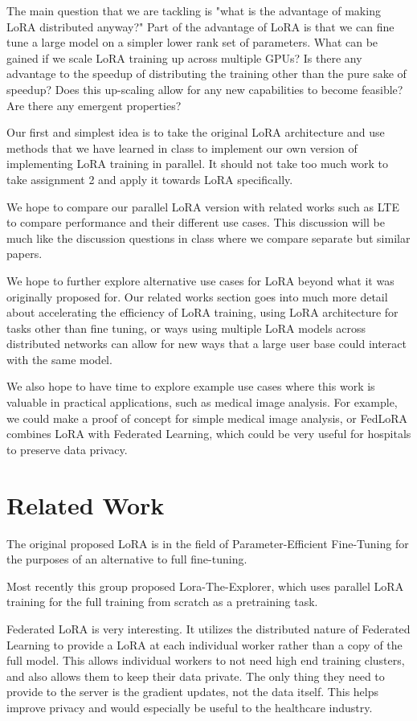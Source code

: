 \documentclass[pdftex,twocolumn,10pt,letterpaper]{article}
\begin{document}
The main question that we are tackling is "what is the advantage of making LoRA distributed anyway?" Part of the advantage of LoRA is that we can fine tune a large model on a simpler lower rank set of parameters. What can be gained if we scale LoRA training up across multiple GPUs? Is there any advantage to the speedup of distributing the training other than the pure sake of speedup? Does this up-scaling allow for any new capabilities to become feasible? Are there any emergent properties?

Our first and simplest idea is to take the original LoRA architecture and use methods that we have learned in class to implement our own version of implementing LoRA training in parallel. It should not take too much work to take assignment 2 and apply it towards LoRA specifically.

We hope to compare our parallel LoRA version with related works such as LTE to compare performance and their different use cases. This discussion will be much like the discussion questions in class where we compare separate but similar papers.

We hope to further explore alternative use cases for LoRA beyond what it was originally proposed for. Our related works section goes into much more detail about accelerating the efficiency of LoRA training, using LoRA architecture for tasks other than fine tuning, or ways using multiple LoRA models across distributed networks can allow for new ways that a large user base could interact with the same model.

We also hope to have time to explore example use cases where this work is valuable in practical applications, such as medical image analysis. For example, we could make a proof of concept for simple medical image analysis, or FedLoRA combines LoRA with Federated Learning, which could be very useful for hospitals to preserve data privacy.
 
\section{Related Work}
\cite{Hu2021LoRA}
The original proposed LoRA is in the field of Parameter-Efficient Fine-Tuning for the purposes of an alternative to full fine-tuning.

\cite{huh2024training}
Most recently this group proposed Lora-The-Explorer, which uses parallel LoRA training for the full training from scratch as a pretraining task. 

\cite{yi2023fedlora}
\cite{Rieke2019FederatedLearning}
Federated LoRA is very interesting. It utilizes the distributed nature of Federated Learning to provide a LoRA at each individual worker rather than a copy of the full model. This allows individual workers to not need high end training clusters, and also allows them to keep their data private. The only thing they need to provide to the server is the gradient updates, not the data itself. This helps improve privacy and would especially be useful to the healthcare industry.
\end{document}
